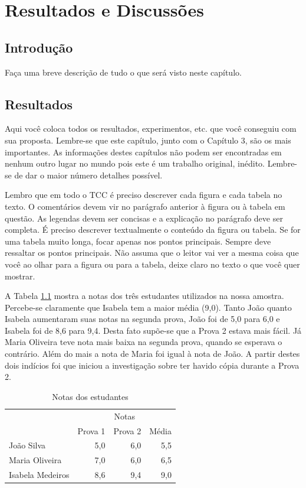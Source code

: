 \chapter{Resultados e Discussões}
\label{ch:resultados}

\section{Introdução}
Faça uma breve descrição de tudo o que será visto neste capítulo.

\section{Resultados}
Aqui você coloca todos os resultados, experimentos, etc. que você conseguiu com sua proposta. Lembre-se que este capítulo, junto com o Capítulo 3, são os mais importantes. As informações destes capítulos não podem ser encontradas em nenhum outro lugar no mundo pois este é um trabalho original, inédito. Lembre-se de dar o maior número detalhes possível. 

Lembro que em todo o TCC é preciso descrever cada figura e cada tabela no texto. O comentários devem vir no parágrafo anterior à figura ou à tabela em questão. As legendas devem ser concisas e a explicação no parágrafo deve ser completa. É preciso descrever textualmente o conteúdo da figura ou tabela. Se for uma tabela muito longa, focar apenas nos pontos principais. Sempre deve ressaltar os pontos principais. Não assuma que o leitor vai ver a mesma coisa que você ao olhar para a figura ou para a tabela, deixe claro no texto o que você quer mostrar.

A Tabela \ref{tab:exemplo} mostra a notas dos três estudantes utilizados na nossa amostra. Percebe-se claramente que Isabela tem a maior média (9,0). Tanto João quanto Isabela aumentaram suas notas na segunda prova, João foi de 5,0 para 6,0 e Isabela foi de 8,6 para 9,4. Desta fato supõe-se que a Prova 2 estava mais fácil. Já Maria Oliveira teve nota mais baixa na segunda prova, quando se esperava o contrário. Além do mais a nota de Maria foi igual à nota de João. A partir destes dois indícios foi que iniciou a investigação sobre ter havido cópia durante a Prova 2.

\begin{table}
\caption{Notas dos estudantes}
\label{tab:exemplo}
\begin{center}
\renewcommand{\tabcolsep}{2 pt}
\begin{tabular}{ l r r r }
\hline
& \multicolumn{3}{c}{Notas}\\
\cline{2 - 4} %
\multicolumn{1}{c}{
\multirow[c]{-2}{*}{Nome}} & Prova 1 & Prova 2 & Média\\
\hline
João Silva & 5{,}0 & 6{,}0 & 5{,}5\\
Maria Oliveira & 7{,}0 & 6{,}0 & 6{,}5\\
Isabela Medeiros & 8{,}6 & 9{,}4 & 9{,}0\\
\hline
\end{tabular}
\end{center}
\end{table}

